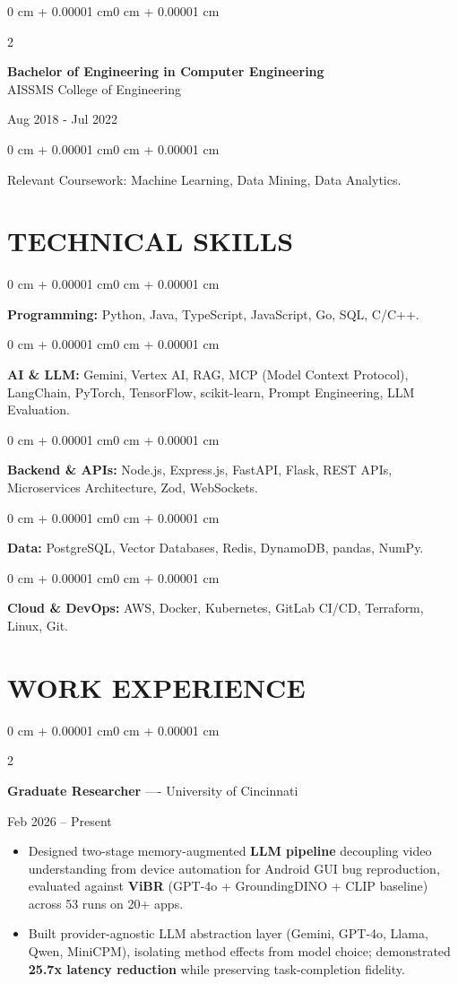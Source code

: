 \documentclass[10pt, letterpaper]{article}
\newenvironment{highlights}{
    \begin{itemize}[
        topsep=0.10 cm,
        parsep=0.06 cm,
        partopsep=0pt,
        itemsep=0.06 cm,
        leftmargin=12pt
    ]
}{
    \end{itemize}
}
\newenvironment{onecolentry}{
    \begin{adjustwidth}{0 cm + 0.00001 cm}{0 cm + 0.00001 cm}
}{
    \end{adjustwidth}
}
\newenvironment{twocolentry}[2][]{
    \onecolentry
    \def\secondColumn{#2}
    \setcolumnwidth{\fill, 4.5 cm}
    \begin{paracol}{2}
}{
    \switchcolumn \raggedleft \secondColumn
    \end{paracol}
    \endonecolentry
}
\begin{document}
\begin{twocolentry}{
    Aug 2018 - Jul 2022
}
    \textbf{Bachelor of Engineering in Computer Engineering} \\
    AISSMS College of Engineering
\end{twocolentry}
\begin{onecolentry}
Relevant Coursework: Machine Learning, Data Mining, Data Analytics.
\end{onecolentry}
\section{TECHNICAL SKILLS}
\begin{onecolentry}
\textbf{Programming:} Python, Java, TypeScript, JavaScript, Go, SQL, C/C++.
\end{onecolentry}
\vspace{0.06 cm}
\begin{onecolentry}
\textbf{AI \& LLM:} Gemini, Vertex AI, RAG, MCP (Model Context Protocol), LangChain, PyTorch, TensorFlow, scikit-learn, Prompt Engineering, LLM Evaluation.
\end{onecolentry}
\vspace{0.06 cm}
\begin{onecolentry}
\textbf{Backend \& APIs:} Node.js, Express.js, FastAPI, Flask, REST APIs, Microservices Architecture, Zod, WebSockets.
\end{onecolentry}
\vspace{0.06 cm}
\begin{onecolentry}
\textbf{Data:} PostgreSQL, Vector Databases, Redis, DynamoDB, pandas, NumPy.
\end{onecolentry}
\vspace{0.06 cm}
\begin{onecolentry}
\textbf{Cloud \& DevOps:} AWS, Docker, Kubernetes, GitLab CI/CD, Terraform, Linux, Git.
\end{onecolentry}

\section{WORK EXPERIENCE}
\begin{twocolentry}{Feb 2026 -- Present}
\textbf{Graduate Researcher} ---- University of Cincinnati
\end{twocolentry}
\begin{highlights}
  \item Designed two-stage memory-augmented \textbf{LLM pipeline} decoupling video understanding from device automation for Android GUI bug reproduction, evaluated against \textbf{ViBR} (GPT-4o + GroundingDINO + CLIP baseline) across 53 runs on 20+ apps.
  \item Built provider-agnostic LLM abstraction layer (Gemini, GPT-4o, Llama, Qwen, MiniCPM), isolating method effects from model choice; demonstrated \textbf{25.7x latency reduction} while preserving task-completion fidelity.
\end{highlights}
\end{document}
